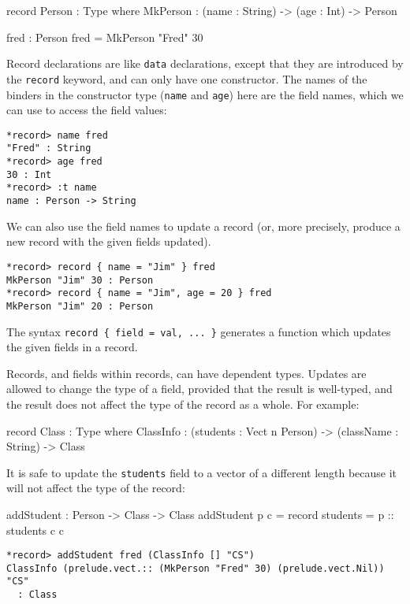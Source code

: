 \begin{code}
record Person : Type where
    MkPerson : (name : String) ->
               (age : Int) -> Person

fred : Person
fred = MkPerson "Fred" 30
\end{code}


\noindent
Record declarations are like \texttt{data} declarations, except that they are  introduced by the \texttt{record} keyword, and can only have one constructor.
The names of the binders in the constructor type (\texttt{name} and \texttt{age}) here are the field names, which we can use to access the field values:

\begin{lstlisting}[style=stdout]
*record> name fred
"Fred" : String
*record> age fred
30 : Int
*record> :t name
name : Person -> String
\end{lstlisting}

\noindent
We can also use the field names to update a record (or, more precisely, produce a new record with the given fields updated).

\begin{lstlisting}[style=stdout]
*record> record { name = "Jim" } fred
MkPerson "Jim" 30 : Person
*record> record { name = "Jim", age = 20 } fred
MkPerson "Jim" 20 : Person
\end{lstlisting}

\noindent
The syntax \texttt{record \{ field = val, ... \}} generates a function which updates the given fields in a record.

Records, and fields within records, can have dependent types.
Updates are allowed to change the type of a field, provided that the result is well-typed, and the result does not affect the type of the record as a whole.
For example:

\begin{code}
record Class : Type where
    ClassInfo : (students : Vect n Person) ->
                (className : String) ->
                Class
\end{code}

\noindent
It is safe to update the \texttt{students} field to a vector of a different length because it will not affect the type of the record:

\begin{code}
addStudent : Person -> Class -> Class
addStudent p c = record { students = p :: students c } c
\end{code}

\begin{lstlisting}[style=stdout]
*record> addStudent fred (ClassInfo [] "CS")
ClassInfo (prelude.vect.:: (MkPerson "Fred" 30) (prelude.vect.Nil)) "CS"
  : Class
\end{lstlisting}


